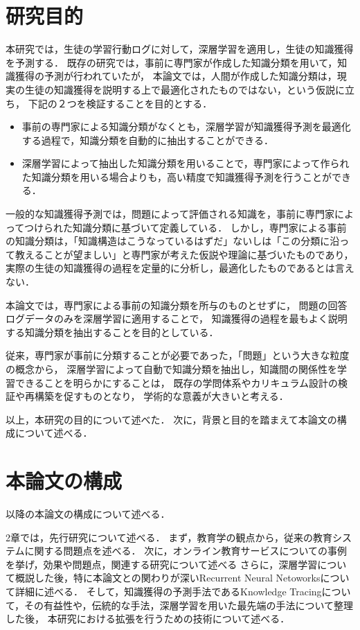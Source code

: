 \section{研究目的}

本研究では，生徒の学習行動ログに対して，深層学習を適用し，生徒の知識獲得を予測する．
既存の研究では，事前に専門家が作成した知識分類を用いて，知識獲得の予測が行われていたが，
本論文では，人間が作成した知識分類は，現実の生徒の知識獲得を説明する上で最適化されたものではない，という仮説に立ち，
下記の２つを検証することを目的とする．
\begin{itemize}
\item 事前の専門家による知識分類がなくとも，深層学習が知識獲得予測を最適化する過程で，知識分類を自動的に抽出することができる．
\item 深層学習によって抽出した知識分類を用いることで，専門家によって作られた知識分類を用いる場合よりも，高い精度で知識獲得予測を行うことができる．
\end{itemize}

一般的な知識獲得予測では，問題によって評価される知識を，事前に専門家によってつけられた知識分類に基づいて定義している．
しかし，専門家による事前の知識分類は，「知識構造はこうなっているはずだ」ないしは「この分類に沿って教えることが望ましい」と専門家が考えた仮説や理論に基づいたものであり，
実際の生徒の知識獲得の過程を定量的に分析し，最適化したものであるとは言えない．

本論文では，専門家による事前の知識分類を所与のものとせずに，
問題の回答ログデータのみを深層学習に適用することで，
知識獲得の過程を最もよく説明する知識分類を抽出することを目的としている．

従来，専門家が事前に分類することが必要であった，「問題」という大きな粒度の概念から，
深層学習によって自動で知識分類を抽出し，知識間の関係性を学習できることを明らかにすることは，
既存の学問体系やカリキュラム設計の検証や再構築を促すものとなり，
学術的な意義が大きいと考える．


\vvspace
以上，本研究の目的について述べた．
次に，背景と目的を踏まえて本論文の構成について述べる．



\section{本論文の構成}
以降の本論文の構成について述べる．

2章では，先行研究について述べる．
まず，教育学の観点から，従来の教育システムに関する問題点を述べる．%
次に，オンライン教育サービスについての事例を挙げ，効果や問題点，関連する研究について述べる
さらに，深層学習について概説した後，特に本論文との関わりが深いRecurrent Neural Netoworksについて詳細に述べる．
そして，知識獲得の予測手法であるKnowledge Tracingについて，その有益性や，伝統的な手法，深層学習を用いた最先端の手法について整理した後，
本研究における拡張を行うための技術について述べる．



